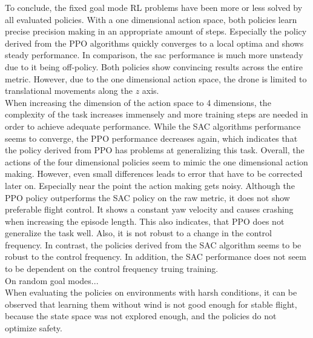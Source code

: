 To conclude, the fixed goal mode RL problems have been more or less solved
by all evaluated policies.
With a one dimensional action space, both policies learn precise precision making 
in an appropriate amount of steps. Especially the policy derived from the PPO algorithms
quickly converges to a local optima and shows steady performance.
In comparison, the sac performance is much more unsteady due to it being off-policy.
Both policies show convincing results across the entire metric.
However, due to the one dimensional action space, the drone is limited to 
translational movements along the $z$ axis.\\
When increasing the dimension of the action space to 4 dimensions, the 
complexity of the task increases immensely and more training steps
are needed in order to achieve adequate performance.
While the SAC algorithms performance seems to converge, the PPO performance
decreases again, which indicates that the policy derived from PPO has problems 
at generalizing this task.
Overall, the actions of the four dimensional policies seem to mimic
the one dimensional action making. However, even small differences leads
to error that have to be corrected later on. 
Especially near the point the action making gets noisy.
Although the PPO policy outperforms the SAC policy on the raw metric,
it does not show preferable flight control.
It shows a constant yaw velocity and causes crashing when increasing the episode length.
This also indicates, that PPO does not generalize the task well.
Also, it is not robust to a change in the control frequency.
In contrast, the policies derived from the SAC algorithm seems to be robust
to the control frequency. In addition, the SAC performance does not seem to be 
dependent on the control frequency truing training.\\
On random goal modes...\\
When evaluating the policies on environments with harsh conditions, it can be observed that 
learning them without wind is not good enough for stable flight, because the state space was not explored enough, and the policies do not optimize safety.

\newpage

